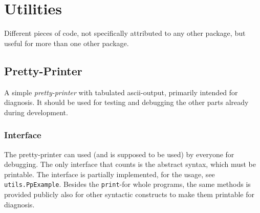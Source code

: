 \section{Utilities}
\label{sec:utils}

Different pieces of code, not specifically attributed to any other package,
but useful for more than one other package.


\subsection{Pretty-Printer}
\label{sec:prettyprinter}


A simple \emph{pretty-printer} with tabulated ascii-output, primarily intended
for diagnosis. It should be used for testing and debugging the other parts
already during development.


\subsubsection*{Interface}

The pretty-printer can used (and is supposed to be used) by everyone for
debugging. The only interface that counts is the abstract syntax, which
must be printable. The interface is partially implemented, for the usage,
see \texttt{utils.PpExample}. Besides the \texttt{print}-for whole
programs, the same methods is provided publicly also for other syntactic
constructs to make them printable for diagnosis.

